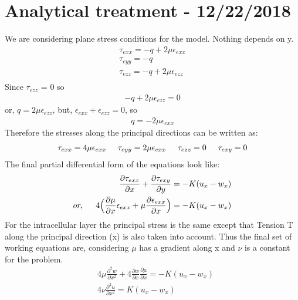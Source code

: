 \documentclass[a4paper,oneside,11pt]{report}
\begin{document}
\section*{Analytical treatment - 12/22/2018}
We are considering plane stress conditions for the model. Nothing depends on y. 
\begin{align*}
\tau_{exx} = -q + 2\mu\epsilon_{exx} \\
\tau_{eyy} = -q \\
\tau_{ezz} = -q + 2\mu\epsilon_{ezz} \\
\end{align*}
Since $\tau_{ezz}$  = 0 so
\begin{align*}
-q + 2\mu\epsilon_{ezz} = 0
\end{align*}
or, $q=2\mu\epsilon_{ezz}$, but, $\epsilon_{exx} + \epsilon_{ezz} = 0$, so 
\begin{align*}
q=-2\mu\epsilon_{exx}
\end{align*}
Therefore the stresses along the principal directions can be written as:
\begin{align*}
\tau_{exx} = 4\mu\epsilon_{exx} \hspace{0.5cm} \tau_{eyy} = 2\mu\epsilon_{exx}\hspace{0.5cm} \tau_{ezz}=0\hspace{0.5cm}\tau_{exy}=0
\end{align*}
The final partial differential form of the equations look like: 
\begin{align*}
\frac{\partial\tau_{exx}}{\partial x} + \frac{\partial\tau_{exy}}{\partial y} = -K(u_x - w_x) \\
or, \hspace{0.5cm}4\Big ( \frac{\partial \mu}{\partial x}\epsilon_{exx}  + \mu \frac{\partial \epsilon_{exx}}{\partial x}\Big ) = -K(u_x - w_x)
\end{align*}
For the intracellular layer the principal stress is the same except that Tension T along the principal direction (x) is also taken into account. Thus the final set of working equations are, considering $\mu$ has a gradient along x and $\nu$ is a constant for the problem. 
\[\boxed{\!\begin{aligned}
	&4\mu\frac{\partial^2 w}{\partial x^2} + 4\frac{\partial w}{\partial x}\frac{\partial \mu}{\partial x} = -K(u_x - w_x) \\
 &4\nu\frac{\partial^2 u}{\partial x^2} = K(u_x - w_x)
\end{aligned}
}
\]
\end{document}
